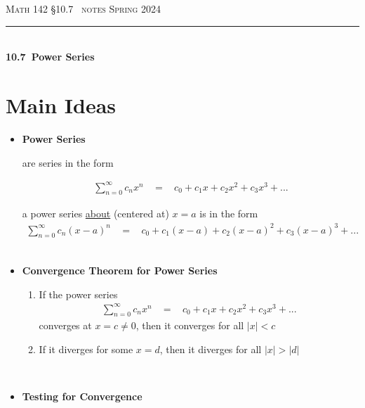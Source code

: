 \documentclass{article}
\def\chapt{10.7}
\def\chaptname{Power Series}
\begin{document}
\noindent
{\scshape Math 142} \hfill {\scshape \S\chapt~ notes} \hfill {\scshape Spring 2024}

\smallskip

\hrule

\bigskip

\hfill
\\

{
\huge
\noindent
\textbf{\chapt~\chaptname}
}

\thispagestyle{empty}

\section*{Main Ideas}

\begin{itemize}

\item
\textbf{Power Series}

are series in the form

\begin{gather*}
\sum_{n=0}^{\infty} c_n x^n
~~~~=~~~~
c_0 + c_1 x + c_2 x^2 + c_3 x^3 + ...
\end{gather*}

a power series \underline{about} (centered at) $x=a$ is in the form
\begin{gather*}
\sum_{n=0}^{\infty} c_n (x-a)^n
~~~~=~~~~
c_0 + c_1 (x-a) + c_2 (x-a)^2 + c_3 (x-a)^3 + ...
\end{gather*}
\hfill
\\

\item
\textbf{Convergence Theorem for Power Series}

\begin{enumerate}

\item
If the power series
\begin{gather*}
\sum_{n=0}^{\infty} c_n x^n
~~~~=~~~~
c_0 + c_1 x + c_2 x^2 + c_3 x^3 + ...
\end{gather*}
converges at $x=c\neq0$, then it converges for
all $|x|<c$
\\

\item
If it diverges for some $x=d$, then it diverges for all $|x|>|d|$

\end{enumerate}
\hfill
\\

\item
\textbf{Testing for Convergence}


\end{itemize}
\end{document}
